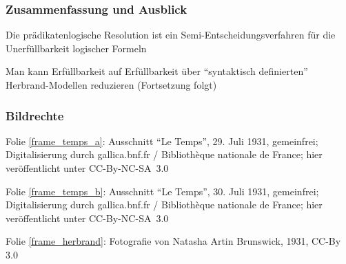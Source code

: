\documentclass[aspectratio=1610,onlymath]{beamer}
\begin{document}
\begin{frame}\frametitle{Zusammenfassung und Ausblick}

Die prädikatenlogische Resolution ist ein Semi-Entscheidungsverfahren für die Unerfüllbarkeit logischer Formeln\bigskip

Man kann Erfüllbarkeit auf Erfüllbarkeit über "`syntaktisch definierten"' Herbrand-Modellen reduzieren
(Fortsetzung folgt)
% 

\bigskip


\end{frame}


\begin{frame}[t]\frametitle{Bildrechte}

Folie \ref{frame_temps_a}: Ausschnitt ``Le Temps'', 29. Juli 1931, gemeinfrei; Digitalisierung durch gallica.bnf.fr / Bibliothèque nationale de France; hier veröffentlicht unter CC-By-NC-SA~3.0
\medskip

Folie \ref{frame_temps_b}: Ausschnitt ``Le Temps'', 30. Juli 1931, gemeinfrei; Digitalisierung durch gallica.bnf.fr / Bibliothèque nationale de France; hier veröffentlicht unter CC-By-NC-SA~3.0
\medskip

Folie \ref{frame_herbrand}: Fotografie von Natasha Artin Brunswick, 1931, CC-By 3.0

\end{frame}
\end{document}
